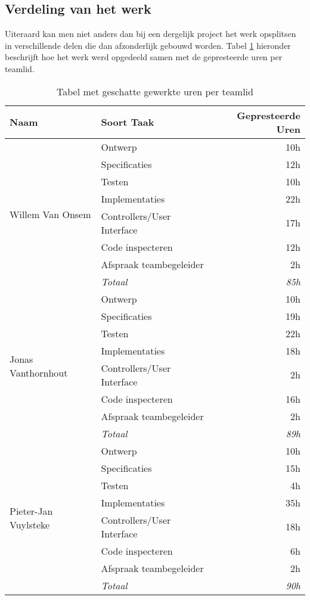 \subsection{Verdeling van het werk}
Uiteraard kan men niet anders dan bij een dergelijk project het werk opsplitsen in verschillende delen die dan afzonderlijk gebouwd worden. Tabel \ref{tbl:workedHours} hieronder beschrijft hoe het werk werd opgedeeld samen met de gepresteerde uren per teamlid.
\begin{table}[H]
\centering
\begin{tabular}{|l|l|r|}
\hline
\textbf{Naam}&\textbf{Soort Taak}&\textbf{Gepresteerde Uren}\\\hline\hline
\multirow{8}{*}{Willem Van Onsem}&Ontwerp&10h\\
&Specificaties&12h\\
&Testen&10h\\
&Implementaties&22h\\
&Controllers/User Interface&17h\\
&Code inspecteren&12h\\
&Afspraak teambegeleider&2h\\
&\textit{Totaal}&\textit{85h}\\\hline
\multirow{8}{*}{Jonas Vanthornhout}&Ontwerp&10h\\
&Specificaties&19h\\
&Testen&22h\\
&Implementaties&18h\\
&Controllers/User Interface&2h\\
&Code inspecteren&16h\\
&Afspraak teambegeleider&2h\\
&\textit{Totaal}&\textit{89h}\\\hline
\multirow{8}{*}{Pieter-Jan Vuylsteke}&Ontwerp&10h\\
&Specificaties&15h\\
&Testen&4h\\
&Implementaties&35h\\
&Controllers/User Interface&18h\\
&Code inspecteren&6h\\
&Afspraak teambegeleider&2h\\
&\textit{Totaal}&\textit{90h}\\\hline
\end{tabular}
\caption{Tabel met geschatte gewerkte uren per teamlid}
\label{tbl:workedHours}
\end{table}

